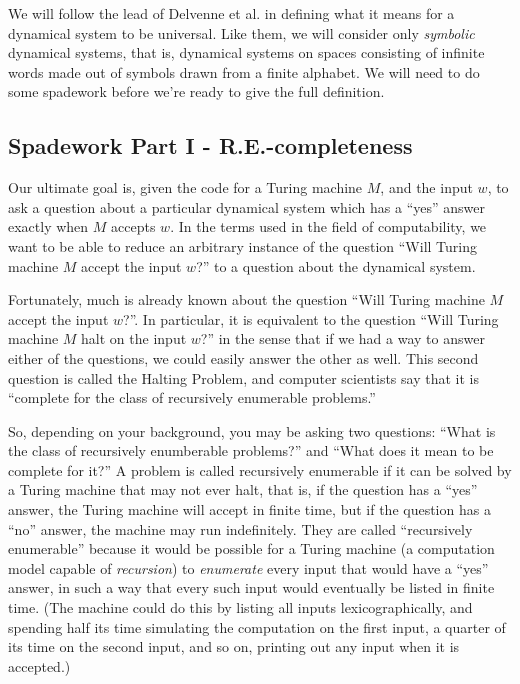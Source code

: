 \documentclass{fkpaper}
\begin{document}
\begin{multicols}{2}
\begin{itemize}
\end{itemize}

We will follow the lead of Delvenne et al. \cite{Delvenne2004Apr} in defining what
it means for a dynamical system to be universal. Like them, we will
consider only {\it symbolic} dynamical systems, that is, dynamical
systems on spaces consisting of infinite words made out of symbols
drawn from a finite alphabet. We will need to do some spadework before
we're ready to give the full definition.

\subsection{Spadework Part I - R.E.-completeness}

Our ultimate goal is, given the code for a Turing machine $M$, and the
input $w$, to ask a question about a particular dynamical system which
has a ``yes'' answer exactly when $M$ accepts $w$. In the terms used
in the field of computability, we want to be able to reduce an
arbitrary instance of the question ``Will Turing machine $M$ accept
the input $w$?'' to a question about the dynamical system.

Fortunately, much is already known about the question ``Will Turing
machine $M$ accept the input $w$?''. In particular, it is equivalent
to the question ``Will Turing machine $M$ halt on the input $w$?'' in
the sense that if we had a way to answer either of the questions, we
could easily answer the other as well. This second question is called
the Halting Problem, and computer scientists say that it is ``complete
for the class of recursively enumerable problems.''

So, depending on your background, you may be asking two questions:
``What is the class of recursively enumberable problems?'' and ``What
does it mean to be complete for it?'' A problem is called recursively
enumerable if it can be solved by a Turing machine that may not ever
halt, that is, if the question has a ``yes'' answer, the Turing
machine will accept in finite time, but if the question has a ``no''
answer, the machine may run indefinitely. They are called
``recursively enumerable'' because it would be possible for a Turing
machine (a computation model capable of {\it recursion}) to {\it
  enumerate} every input that would have a ``yes'' answer, in such a
way that every such input would eventually be listed in finite time.
(The machine could do this by listing all inputs lexicographically,
and spending half its time simulating the computation on the first
input, a quarter of its time on the second input, and so on, printing
out any input when it is accepted.)


\end{multicols}
\end{document}
